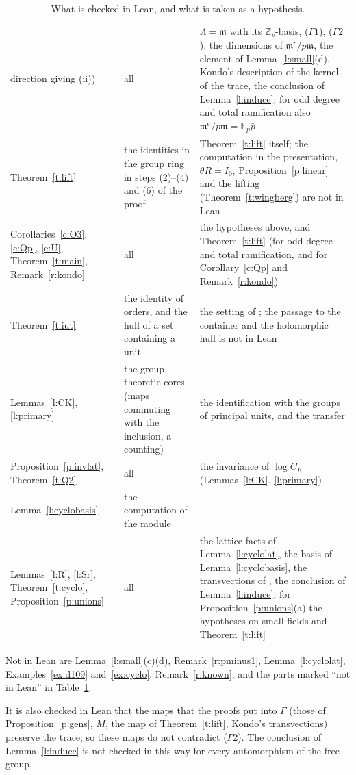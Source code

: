 \documentclass[11pt,a4paper]{article}
\newcommand{\Zp}{\mathbb{Z}_p}
\newcommand{\Fp}{\mathbb{F}_p}
\newcommand{\fm}{\mathfrak{m}}
\theoremstyle{plain}
\theoremstyle{definition}
\theoremstyle{remark}
\begin{document}
\begin{table}[p]
\begin{tabular}{@{}>{\raggedright\arraybackslash}p{}>{\raggedright\arraybackslash}p{}>{\raggedright\arraybackslash}p{}@{}}
direction giving (ii)) & all & $\Lambda=\fm$ with its $\Zp$-basis, ($\Gamma1$), ($\Gamma2$), the dimensions of
$\fm^r/p\fm$, the element of Lemma~\ref{l:small}(d), Kondo's description of the kernel of the trace, the conclusion of
Lemma~\ref{l:induce}; for odd degree and total ramification also $\fm^e/p\fm=\Fp\bar p$\\
Theorem~\ref{t:lift} & the identities in the group ring in steps (2)--(4) and (6) of the proof & Theorem~\ref{t:lift}
itself; the computation in the presentation, $\theta R=I_0$, Proposition~\ref{p:linear} and the lifting
(Theorem~\ref{t:wingberg}) are not in Lean\\
Corollaries~\ref{c:O3}, \ref{c:Qp}, \ref{c:U}, Theorem~\ref{t:main}, Remark~\ref{r:kondo} & all & the hypotheses
above, and Theorem~\ref{t:lift} (for odd degree and total ramification, and for Corollary~\ref{c:Qp} and
Remark~\ref{r:kondo})\\
Theorem~\ref{t:iut} & the identity of orders, and the hull of a set containing a unit & the setting of \cite{Tiers}; the
passage to the container and the holomorphic hull is not in Lean\\
Lemmas~\ref{l:CK}, \ref{l:primary} & the group-theoretic cores (maps commuting with the inclusion, a counting) & the
identification with the groups of principal units, and the transfer\\
Proposition~\ref{p:invlat}, Theorem~\ref{t:Q2} & all & the invariance of $\log C_K$ (Lemmas~\ref{l:CK},
\ref{l:primary})\\
Lemma~\ref{l:cyclobasis} & the computation of the module & \cite[Prop.~1.1, Lemma~1.3]{HN}\\
Lemmas~\ref{l:R}, \ref{l:Sr}, Theorem~\ref{t:cyclo}, Proposition~\ref{p:unions} & all & the lattice facts of
Lemma~\ref{l:cyclolat}, the basis of Lemma~\ref{l:cyclobasis}, the transvections of \cite[Lemma~3.3]{Kondo26}, the
conclusion of Lemma~\ref{l:induce}; for Proposition~\ref{p:unions}(a) the hypotheses on small fields and
Theorem~\ref{t:lift}\\
\bottomrule
\end{tabular}
\caption{What is checked in Lean, and what is taken as a hypothesis.}\label{tab:lean}
\end{table}

Not in Lean are Lemma~\ref{l:small}(c)(d), Remark~\ref{r:pminus1}, Lemma~\ref{l:cyclolat}, Examples~\ref{ex:d109}
and~\ref{ex:cyclo}, Remark~\ref{r:known}, and the parts marked ``not in Lean'' in Table~\ref{tab:lean}.

It is also checked in Lean that the maps that the proofs put into $\Gamma$ (those of Proposition~\ref{p:gens}, $M$, the
map of Theorem~\ref{t:lift}, Kondo's transvections) preserve the trace; so these maps do not contradict ($\Gamma2$).
The conclusion of Lemma~\ref{l:induce} is not checked in this way for every automorphism of the free group.
\end{document}

